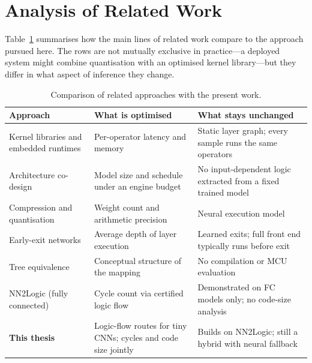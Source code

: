 \section{Analysis of Related Work}
\label{sec:rw-analysis}

Table~\ref{tab:rw-comparison} summarises how the main lines of related work compare to the approach pursued here.
The rows are not mutually exclusive in practice---a deployed system might combine quantisation with an optimised kernel library---but they differ in what aspect of inference they change.

\begin{table}[htbp]
	\centering
	\small
	\setlength{\tabcolsep}{6pt}
	\renewcommand{\arraystretch}{1.2}
	\begin{tabularx}{\textwidth}{@{}>{\raggedright\arraybackslash}p{}>{\raggedright\arraybackslash}X>{\raggedright\arraybackslash}X@{}}
		\toprule
		\textbf{Approach} & \textbf{What is optimised} & \textbf{What stays unchanged} \\
		\midrule
		Kernel libraries and embedded runtimes\newline
		{\footnotesize\cite{lai2018cmsisnn,david2021tflite}}
		& Per-operator latency and memory
		& Static layer graph; every sample runs the same operators \\
		Architecture co-design\newline
		{\footnotesize\cite{lin2020mcunet}}
		& Model size and schedule under an engine budget
		& No input-dependent logic extracted from a fixed trained model \\
		Compression and quantisation\newline
		{\footnotesize\cite{han2015deepcompression,jacob2018quantization,sun2023classquant}}
		& Weight count and arithmetic precision
		& Neural execution model \\
		Early-exit networks\newline
		{\footnotesize\cite{teerapittayanon2016branchynet,wang2024earlyexit,guo2025dynamic}}
		& Average depth of layer execution
		& Learned exits; full front end typically runs before exit \\
		Tree equivalence\newline
		{\footnotesize\cite{aytekin2022nns}}
		& Conceptual structure of the mapping
		& No compilation or \ac{MCU} evaluation \\
		NN2Logic (fully connected)\newline
		{\footnotesize\cite{stein2026nn2logic}}
		& Cycle count via certified logic flow
		& Demonstrated on FC models only; no code-size analysis \\
		\addlinespace
		\textbf{This thesis}
		& Logic-flow routes for tiny \acp{CNN}; cycles and code size jointly
		& Builds on NN2Logic; still a hybrid with neural fallback \\
		\bottomrule
	\end{tabularx}
	\caption{Comparison of related approaches with the present work.}
	\label{tab:rw-comparison}
\end{table}

